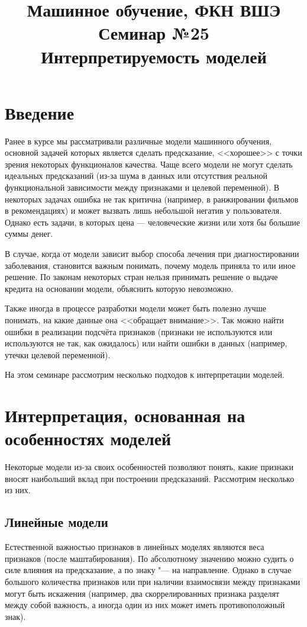 \documentclass[12pt,a4paper]{article}
\title{Машинное обучение, ФКН ВШЭ\\Семинар №25\\Интерпретируемость моделей}
\begin{document}
\author{}
\date{}
\maketitle

\section{Введение}

Ранее в курсе мы рассматривали различные модели машинного обучения, основной задачей которых является сделать предсказание, <<хорошее>> с точки зрения некоторых функционалов качества. Чаще всего модели не могут сделать идеальных предсказаний (из-за шума в данных или отсутствия реальной функциональной зависимости между признаками и целевой переменной). В некоторых задачах ошибка не так критична (например, в ранжировании фильмов в рекомендациях) и может вызвать лишь небольшой негатив у пользователя. Однако есть задачи, в которых цена --- человеческие жизни или хотя бы большие суммы денег.

В случае, когда от модели зависит выбор способа лечения при диагностировании заболевания, становится важным понимать, почему модель приняла то или иное решение. По законам некоторых стран нельзя принимать решение о выдаче кредита на основании модели, объяснить которую невозможно.

Также иногда в процессе разработки модели может быть полезно лучше понимать, на какие данные она <<обращает внимание>>. Так можно найти ошибки в реализации подсчёта признаков (признаки не используются или используются не так, как ожидалось) или найти ошибки в данных (например, утечки целевой переменной).

На этом семинаре рассмотрим несколько подходов к интерпретации моделей.

\section{Интерпретация, основанная на особенностях моделей}

Некоторые модели из-за своих особенностей позволяют понять, какие признаки вносят наибольший вклад при построении предсказаний. Рассмотрим несколько из них.

\subsection{Линейные модели}
\par Естественной важностью признаков в линейных моделях являются веса признаков (после маштабирования). По абсолютному значению можно судить о силе влияния на предсказание, а по знаку "--- на направление. Однако в случае большого количества признаков или при наличии взаимосвязи между признаками могут быть искажения (например, два скоррелированных признака разделят между собой важность, а иногда один из них может иметь противоположный знак).
\end{document}
